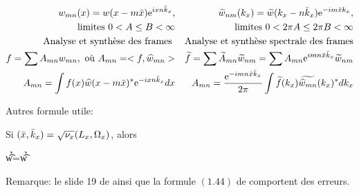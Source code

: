 \begin{align}
w_{mn}(x)=w(x-m\b{x})\e^{ixn\b{k}_x},  &	&	\t{w}_{nm}(k_x)=\t{w}(k_x-n\bar{k}_x)\e^{-im\bar{x}k_x},
\nonumber\\
\text{limites }0<A\leq B<\infty	&	&	\text{limites }0<2\pi A\leq 2\pi B<\infty
\nonumber\\
\text{Analyse et synthèse des frames
}	&	&	\text{Analyse et synthèse spectrale des frames}
\nonumber\\
f=\Sum A_{mn}w_{mn},\text{ où }A_{mn}=<f,\h{w}_{mn}>	&	&	
\t{f}=\Sum \t{A}_{mn}\t{w}_{nm}=\Sum A_{mn}\e^{imn\b{x}\b{k}_x}\t{w}_{nm}
\label{analyse}\\
A_{mn}=\Int f(x)\h{w}(x-m\b{x})^\ast \e^{-ixn\b{k}_x}dx	&	&
A_{mn}=\f[\e^{-imn\b{x}\b{k}_x}]{2\pi}\Int \t{f}(k_x)\t{\h{w}_{mn}}(k_x)^\ast dk_x
\label{synthese}
\end{align}


Autres formule utile:

 Si $(\bar{x},\bar{k}_x)={\sqrt{\nu_x}}(L_x,\Omega_x)$, alors

 \be
 \t{\h{w}}=\h{\t{w}}
 \label{duals}
 \ee


Remarque: le slide 19 de \cite{SlidesLetrou} ainsi que la formule $(1.44)$ de \cite{TheseLugara} comportent des erreurs.


\newpage